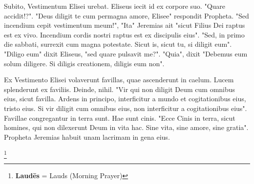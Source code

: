 Subito, Vestimentum Elisei urebat. Eliseus iecit id ex corpore suo. "Quare accidit!?". "Deus diligit te cum permagna amore, Elisee" respondit Propheta. "Sed incendium cepit vestimentum meum!", "Ita" Jeremias ait "sicut Filius Dei raptus est ex vivo. Incendium cordis nostri raptus est ex discipulis eius". "Sed, in primo die sabbati, surrexit cum magna potestate. Sicut is, sicut tu, si diligit eum". "Diligo eum" dixit Eliseus, "sed quare pulsavit me?". "Quia", dixit "Debemus eum solum diligere. Si diligis creationem, diligis eum non". \par 
Ex Vestimento Elisei volaverunt favillas, quae ascenderunt in caelum. Lucem splenderunt ex faviliis. Deinde, nihil. "Vir qui non diligit Deum cum omnibus eius, sicut favilla. Ardens in principo, interficitur a mundo et cogitationibus eius, tristo eius. Si vir diligit cum omnibus eius, non interficitur a cogitationibus eius". Favillae congregantur in terra sunt. Hae sunt cinis. "Ecce Cinis in terra, sicut homines, qui non dilexerunt Deum in vita hac. Sine vita, sine amore, sine gratia". Propheta Jeremias habuit unam lacrimam in gena eius. \par 



\footnote{\textbf{Laudēs} = Lauds (Morning Prayer)}

